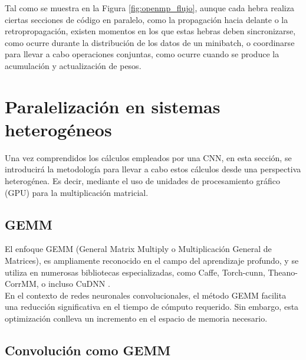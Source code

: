 Tal como se muestra en la Figura \ref{fig:openmp_flujo}, aunque cada hebra realiza ciertas secciones de código en paralelo, como la propagación hacia delante o la retropropagación, existen momentos en los que estas hebras deben sincronizarse, como ocurre durante la distribución de los datos de un minibatch, o coordinarse para llevar a cabo operaciones conjuntas, como ocurre cuando se produce la acumulación y actualización de pesos.


\section{Paralelización en sistemas heterogéneos}
Una vez comprendidos los cálculos empleados por una CNN, en esta sección, se introducirá la metodología para llevar a cabo estos cálculos desde una perspectiva heterogénea. Es decir, mediante el uso de unidades de procesamiento gráfico (GPU) para la multiplicación matricial.

\subsection{GEMM}

El enfoque GEMM \cite{GEMM_definition} (General Matrix Multiply o Multiplicación General de Matrices), es ampliamente reconocido en el campo del aprendizaje profundo, y se utiliza en numerosas bibliotecas especializadas, como Caffe, Torch-cunn, Theano-CorrMM, o incluso CuDNN \cite{conv_GEMM_FFT_comparacion}. \\
En el contexto de redes neuronales convolucionales, el método GEMM facilita una reducción significativa en el tiempo de cómputo requerido. Sin embargo, esta optimización conlleva un incremento en el espacio de memoria necesario. 

\subsection{Convolución como GEMM \label{Intro_GEMMM}}

